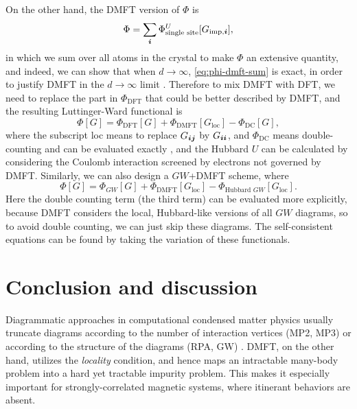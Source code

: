 \documentclass[hyperref, a4paper]{article}
\begin{document}
On the other hand, the DMFT version of $\Phi$ is 
\begin{equation}
    \Phi = \sum_{\vb*{i}} \Phi^U_{\text{single site}}[G_{\text{imp}, \vb*{i}}],
    \label{eq:phi-dmft-sum}
\end{equation}
in which we sum over all atoms in the crystal 
to make $\Phi$ an extensive quantity,
and indeed, we can show that when $d \to \infty$,
\eqref{eq:phi-dmft-sum} is exact, 
in order to justify DMFT in the $d \to \infty$ limit \cite{georges1996dynamical}.
Therefore to mix DMFT with DFT, 
we need to replace the part in $\Phi_{\text{DFT}}$ that could be better described by DMFT,
and the resulting Luttinger-Ward functional is 
\begin{equation}
    \Phi[G] = \Phi_{\text{DFT}}[G] + \Phi_{\text{DMFT}}[G_{\text{loc}}] - \Phi_{\text{DC}}[G],
\end{equation}
where the subscript loc means to replace $G_{\vb*{i} \vb*{j}}$ by $G_{\vb*{i} \vb*{i}}$, 
and $\Phi_{\text{DC}}$ means double-counting and can be evaluated exactly \cite{haule2015exact},
and the Hubbard $U$ can be calculated 
by considering the Coulomb interaction screened by 
electrons not governed by DMFT.
Similarly, we can also design a $GW$+DMFT scheme,
where 
\begin{equation}
    \Phi[G] = \Phi_{GW}[G] + \Phi_{\text{DMFT}}[G_{\text{loc}}] - \Phi_{\text{Hubbard } GW}[G_{\text{loc}}].
\end{equation}
Here the double counting term (the third term) can be evaluated more explicitly,
because DMFT considers the local, Hubbard-like versions of all $GW$ diagrams,
so to avoid double counting, 
we can just skip these diagrams.
The self-consistent equations can be found by taking the variation of these functionals.

\section{Conclusion and discussion}

Diagrammatic approaches in computational condensed matter physics 
usually truncate diagrams 
according to the number of interaction vertices (MP2, MP3) 
or according to the structure of the diagrams (RPA, GW) \cite{ren2012random,bruneval2021gw}.
DMFT, on the other hand, 
utilizes the \emph{locality} condition,
and hence maps an intractable many-body problem into 
a hard yet tractable impurity problem.
This makes it especially important for strongly-correlated magnetic systems,
where itinerant behaviors are absent.
\end{document}
